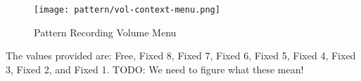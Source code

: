 \begin{figure}[H]
   \centering 
   \texttt{[image: pattern/vol-context-menu.png]}
   \caption{Pattern Recording Volume Menu}
   \label{fig:pattern_edit_recording_volume_menu}
\end{figure}

   The values provided are:
   Free, Fixed 8, Fixed 7, Fixed 6, Fixed 5, Fixed 4, Fixed 3,
   Fixed 2, and Fixed 1.
   TODO: 
   We need to figure what these mean!

